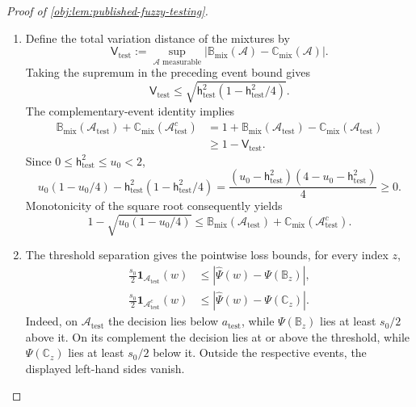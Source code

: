 \documentclass[11pt]{article}
\begin{document}
\begin{proof}[Proof of \cref{obj:lem:published-fuzzy-testing}]
\begin{enumerate}
\item Define the total variation distance of the mixtures by
\[
\mathsf V_{\mathrm{test}}
:=\sup_{\mathcal A\text{ measurable}}
|\mathbb B_{\mathrm{mix}}(\mathcal A)
-\mathbb C_{\mathrm{mix}}(\mathcal A)|.
\]
Taking the supremum in the preceding event bound gives
\[
\mathsf V_{\mathrm{test}}
\le
\sqrt{\mathsf h_{\mathrm{test}}^2
                   (1-\mathsf h_{\mathrm{test}}^2/4)}.
\]
The complementary-event identity implies
\[
\begin{aligned}
\mathbb B_{\mathrm{mix}}(\mathcal A_{\mathrm{test}})
+\mathbb C_{\mathrm{mix}}(\mathcal A_{\mathrm{test}}^c)
&=1+\mathbb B_{\mathrm{mix}}(\mathcal A_{\mathrm{test}})
       -\mathbb C_{\mathrm{mix}}(\mathcal A_{\mathrm{test}})\\
&\ge 1-\mathsf V_{\mathrm{test}}.
\end{aligned}
\]
Since \(0\le\mathsf h_{\mathrm{test}}^2\le u_0<2\),
\[
u_0(1-u_0/4)
-\mathsf h_{\mathrm{test}}^2(1-\mathsf h_{\mathrm{test}}^2/4)
=
\frac{(u_0-\mathsf h_{\mathrm{test}}^2)
      (4-u_0-\mathsf h_{\mathrm{test}}^2)}{4}
\ge0.
\]
Monotonicity of the square root consequently yields
\[
1-\sqrt{u_0(1-u_0/4)}
\le
\mathbb B_{\mathrm{mix}}(\mathcal A_{\mathrm{test}})
+\mathbb C_{\mathrm{mix}}(\mathcal A_{\mathrm{test}}^c).
\]

\item The threshold separation gives the pointwise loss bounds, for every index \(z\),
\[
\begin{aligned}
\frac{s_0}{2}\mathbf 1_{\mathcal A_{\mathrm{test}}}(w)
&\le|\widehat\Psi(w)-\Psi(\mathbb B_z)|,\\
\frac{s_0}{2}\mathbf 1_{\mathcal A_{\mathrm{test}}^c}(w)
&\le|\widehat\Psi(w)-\Psi(\mathbb C_z)|.
\end{aligned}
\]
Indeed, on \(\mathcal A_{\mathrm{test}}\) the decision lies below
\(a_{\mathrm{test}}\), while \(\Psi(\mathbb B_z)\) lies at least \(s_0/2\)
above it. On its complement the decision lies at or above the threshold,
while \(\Psi(\mathbb C_z)\) lies at least \(s_0/2\) below it. Outside the
respective events, the displayed left-hand sides vanish.


\end{enumerate}
\end{proof}
\end{document}
